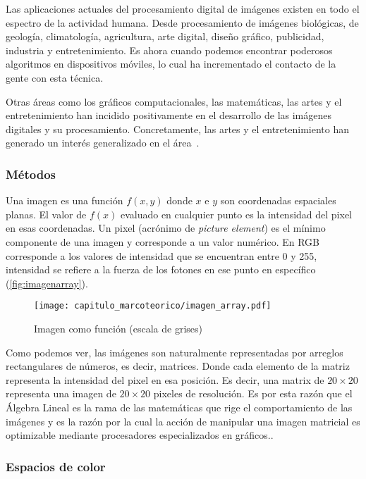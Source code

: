 Las aplicaciones actuales del procesamiento digital de imágenes existen en todo
el espectro de la actividad humana. Desde procesamiento de imágenes biológicas,
de geología, climatología, agricultura, arte digital, diseño gráfico,
publicidad, industria y entretenimiento. Es ahora cuando podemos encontrar
poderosos algoritmos en dispositivos móviles, lo cual ha incrementado el
contacto de la gente con esta técnica.

Otras áreas como los gráficos computacionales, las matemáticas, las artes y el
entretenimiento han incidido positivamente en el desarrollo de las imágenes
digitales y su procesamiento. Concretamente, las artes y el entretenimiento han
generado un interés generalizado en el área~\cite{Gonzalez2001}.

\subsubsection{Métodos}

Una imagen  es una función \(f(x,y)\) donde \(x\) e \(y\)
son coordenadas espaciales planas. El valor de \(f(x)\) evaluado en cualquier
punto es la intensidad del pixel en esas coordenadas. Un pixel (acrónimo de
\emph{picture element}) es el mínimo componente de una imagen y corresponde a un
valor numérico. En RGB corresponde a los valores de intensidad que se encuentran
entre 0 y 255, intensidad se refiere a la fuerza de los fotones en ese punto en
específico (\autoref{fig:imagenarray}).

\begin{figure}[H]
    \centering
    \texttt{[image: capitulo\_marcoteorico/imagen\_array.pdf]}
    \caption{Imagen como función (escala de grises)}\label{fig:imagenarray}
\end{figure}

Como podemos ver, las imágenes son naturalmente representadas por arreglos
rectangulares de números, es decir, matrices. Donde cada elemento de la matriz
representa la intensidad del pixel en esa posición. Es decir, una matrix de \(20
\times 20\) representa una imagen de \(20 \times 20\) pixeles de resolución. Es
por esta razón que el Álgebra Lineal es la rama de las matemáticas que rige el
comportamiento de las imágenes y es la razón por la cual la acción de manipular
una imagen matricial es optimizable mediante procesadores especializados en
gráficos..

\subsubsection{Espacios de color}

